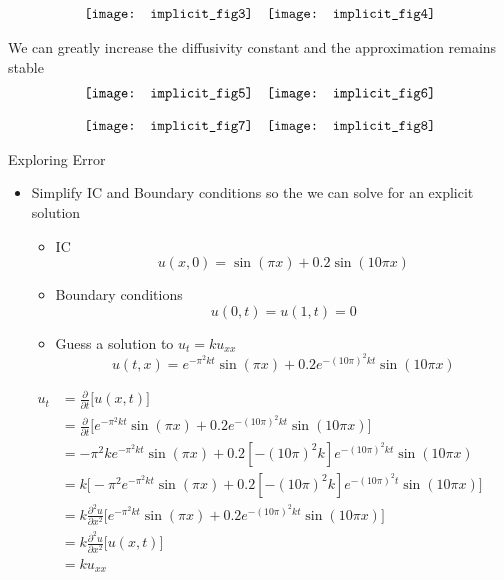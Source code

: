 \documentclass[compress]{beamer}
\begin{document}
\begin{frame}
\[
\begin{array}{c c}
\texttt{[image: implicit\_fig3]} 	&	\texttt{[image: implicit\_fig4]} 
\end{array}	
\]
\end{frame}


\begin{frame}
We can greatly increase the diffusivity constant and the approximation remains stable
\[
\begin{array}{c c}
\texttt{[image: implicit\_fig5]} 	&	\texttt{[image: implicit\_fig6]} 
\end{array}	
\]
\end{frame}


\begin{frame}
\[
\begin{array}{c c}
\texttt{[image: implicit\_fig7]} 	&	\texttt{[image: implicit\_fig8]} 
\end{array}	
\]
\end{frame}

\begin{frame}
\begin{center}
Exploring Error
\end{center}
\begin{itemize}
\item Simplify IC and Boundary conditions so the we can solve for an explicit solution
\begin{itemize}
\item IC
$$u(x,0)=\sin (\pi x)+0.2\sin (10\pi x)$$
\item Boundary conditions 
$$u(0,t)=u(1,t)=0$$
\item Guess a solution to $u_t=ku_{xx}$ 
$$u(t,x)=e^{-\pi ^2kt}\sin(\pi x)+0.2e^{-(10\pi)^2kt}\sin(10\pi x)$$
\end{itemize}
\end{itemize}
\end{frame}

\begin{frame}
\begin{align*}
u_t 	&=\frac{\partial}{\partial t}\Big[u(x,t)\Big]			\\
		&=	\frac{\partial}{\partial t}\Big[e^{-\pi ^2kt}\sin(\pi x)+0.2e^{-(10\pi)^2kt}\sin(10\pi x)\Big] 	\\
		&=	-\pi ^2ke^{-\pi ^2kt}\sin(\pi x)+0.2\left[-(10\pi)^2k\right]e^{-(10\pi)^2kt}\sin(10\pi x)					\\
		&=	k\Big[-\pi ^2e^{-\pi ^2kt}\sin(\pi x)+0.2\left[-(10\pi)^2k\right]e^{-(10\pi)^2t}\sin(10\pi x)\Big]		\\
		&=k\frac{\partial ^2u}{\partial x^2}\Big[e^{-\pi ^2kt}\sin(\pi x)+0.2e^{-(10\pi)^2kt}\sin(10\pi x)\Big]		\\
		&=k\frac{\partial ^2u}{\partial x^2}\Big[u(x,t)\Big]	\\
		&=ku_{xx}
\end{align*}
\end{frame}
\end{document}
